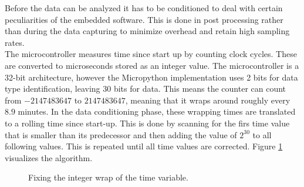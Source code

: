 Before the data can be analyzed it has to be conditioned to deal with certain peculiarities of the embedded software. This is done in post processing rather than during the data capturing to minimize overhead and retain high sampling rates.\\

The microcontroller measures time since start up by counting clock cycles. These are converted to microseconds stored as an integer value. The microcontroller is a 32-bit architecture, however the Micropython implementation uses 2 bits for data type identification, leaving 30 bits for data. This means the counter can count from $-2147483647$ to $2147483647$, meaning that it wraps around roughly every $8.9$ minutes. In the data conditioning phase, these wrapping times are translated to a rolling time since start-up. This is done by scanning for the firs time value that is smaller than its predecessor and then adding the value of $2^{30}$ to all following values. This is repeated until all time values are corrected. Figure \ref{fig:wrap} visualizes the algorithm.\\

\begin{figure}
	\begin{center}
		\caption{Fixing the integer wrap of the time variable.}
		\label{fig:wrap}
	\end{center}
\end{figure}

